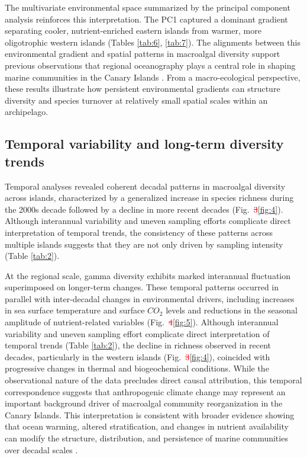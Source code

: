 \documentclass[a4paper,fleqn]{cas-sc}
\DeclareRobustCommand{\deleted}[1]{\textcolor{red}{\sout{#1}}}
\DeclareRobustCommand{\added}[1]{\textcolor{blue}{#1}}
\begin{document}
The multivariate environmental space summarized by the principal component analysis reinforces this interpretation. The PC1 captured a dominant gradient separating cooler, nutrient-enriched eastern islands from warmer, more oligotrophic western islands (Tables \ref{tab:6}, \ref{tab:7}). The alignments between this environmental gradient and spatial patterns in macroalgal diversity support previous observations that regional oceanography plays a central role in shaping marine communities in the Canary Islands \citep{SANGIL2012, Bianchi2012, Valdazoetal2017}. From a macro-ecological perspective, these results illustrate how persistent environmental gradients can structure diversity and species turnover at relatively small spatial scales within an archipelago.

\subsection{Temporal variability and long-term diversity trends}

Temporal analyses revealed coherent decadal patterns in macroalgal diversity across islands, characterized by a generalized increase in species richness during the 2000s decade followed by a decline in more recent decades (Fig.~\deleted{3}\added{\ref{fig:4}}). Although interannual variability and uneven sampling efforts complicate direct interpretation of temporal trends, the consistency of these patterns across multiple islands suggests that they are not only driven by sampling intensity (Table \ref{tab:2}).

At the regional scale, gamma diversity exhibits marked interannual fluctuation superimposed on longer-term changes. These temporal patterns occurred in parallel with inter-decadal changes in environmental drivers, including increases in sea surface temperature and surface $CO_{2}$ levels and reductions in the seasonal amplitude of nutrient-related variables (Fig.~\deleted{4}\added{\ref{fig:5}}). Although interannual variability and uneven sampling effort complicate direct interpretation of temporal trends (Table \ref{tab:2}), the decline in richness observed in recent decades, particularly in the western islands (Fig.~\deleted{3}\added{\ref{fig:4}}), coincided with progressive changes in thermal and biogeochemical conditions. While the observational nature of the data precludes direct causal attribution, this temporal correspondence suggests that anthropogenic climate change may represent an important background driver of macroalgal community reorganization in the Canary Islands. This interpretation is consistent with broader evidence showing that ocean warming, altered stratification, and changes in nutrient availability can modify the structure, distribution, and persistence of marine communities over decadal scales \citep{Doneyetal2012, Antao2020, JI202191, Noissetteetal2022}.
\end{document}
